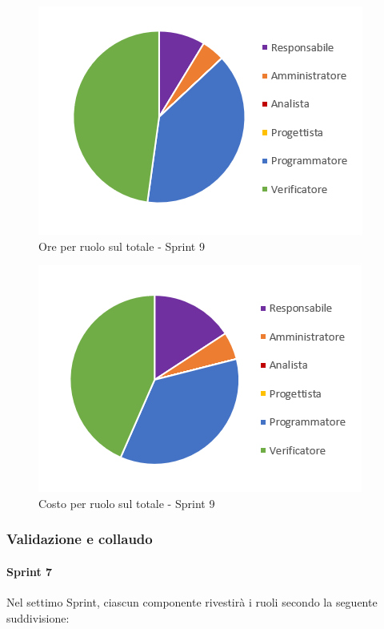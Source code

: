 \begin{figure}[H]
  \centering
  \includegraphics[scale=0.8]{immagini/9Sprint_oreRuolo.png}
  \caption{Ore per ruolo sul totale - Sprint 9}
\end{figure}

\begin{figure}[H]
  \centering
  \includegraphics[scale=0.8]{immagini/9Sprint_costoRuolo.png}
  \caption{Costo per ruolo sul totale - Sprint 9}
\end{figure}
\pagebreak

\pagebreak


\subsubsection{Validazione e collaudo} \label{subsubsection:preventivo_validazione}
\paragraph{Sprint 7} \label{paragraph:preventivo_sprint7}
Nel settimo Sprint\glo{}, ciascun componente rivestirà i ruoli secondo la seguente suddivisione:

